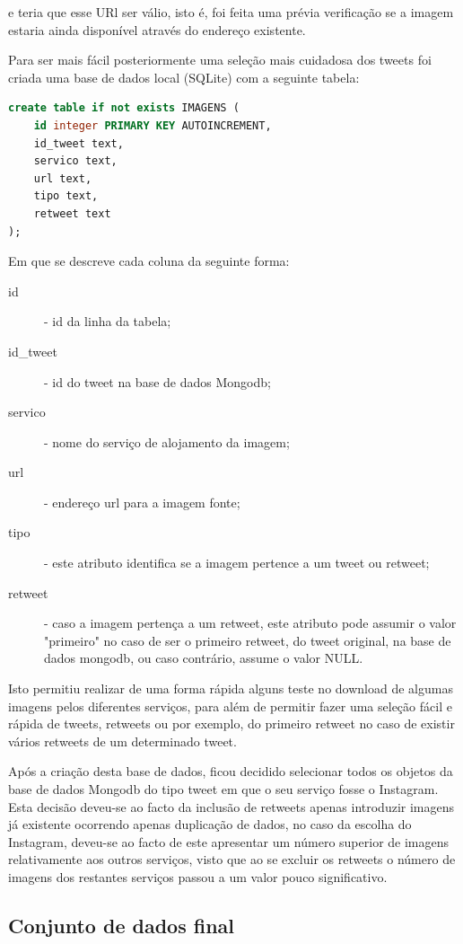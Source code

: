 e teria que esse URl ser válio, isto é, foi feita uma prévia verificação se a imagem estaria ainda disponível através do endereço existente.

Para ser mais fácil posteriormente uma seleção mais cuidadosa dos tweets foi criada uma base de dados local (SQLite) com a seguinte tabela:

\begin{lstlisting}[language=SQL]
create table if not exists IMAGENS ( 
	id integer PRIMARY KEY AUTOINCREMENT, 
	id_tweet text, 
	servico text, 
	url text, 
	tipo text, 
	retweet text 
); 
\end{lstlisting}

Em que se descreve cada coluna da seguinte forma:

\begin{description}
\item[id] - id da linha da tabela;
\item[id\_tweet] - id do tweet na base de dados Mongodb;
\item[servico] - nome do serviço de alojamento da imagem;
\item[url] - endereço url para a imagem fonte;
\item[tipo] - este atributo identifica se a imagem pertence a um tweet ou retweet;
\item[retweet] - caso a imagem pertença a um retweet, este atributo pode assumir o valor "primeiro" no caso de ser o primeiro retweet, do tweet original, na base de dados mongodb, ou caso contrário, assume o valor NULL.
\end{description}

Isto permitiu realizar de uma forma rápida alguns teste no download de algumas imagens pelos diferentes serviços, para além de permitir fazer uma seleção fácil e rápida de tweets, retweets ou por exemplo, do primeiro retweet no caso de existir vários retweets de um determinado tweet. 

Após a criação desta base de dados, ficou decidido selecionar todos os objetos da base de dados Mongodb do tipo tweet em que o seu serviço fosse o Instagram. Esta decisão deveu-se ao facto da inclusão de retweets apenas introduzir imagens já existente ocorrendo apenas duplicação de dados, no caso da escolha do Instagram, deveu-se ao facto de este apresentar um número superior de imagens relativamente aos outros serviços, visto que ao se excluir os retweets o número de imagens dos restantes serviços passou a um valor pouco significativo.

\subsection{Conjunto de dados final}

